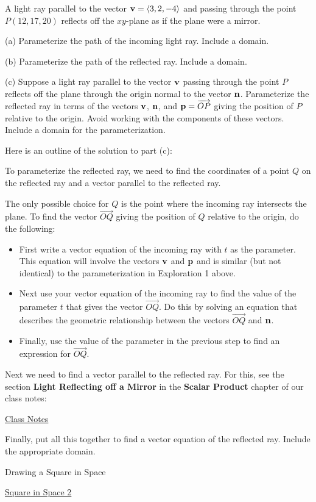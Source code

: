 \documentclass{ximera}
\begin{document}
\begin{question}  \label{Qdr5577:Lines}
A light ray parallel to the vector ${\bf v} = \langle 3,2,-4 \rangle$ and passing through the point $P(12, 17,20)$ reflects off the $xy$-plane as if the plane were a mirror.

(a) Parameterize the path of the incoming light ray. Include a domain.

(b) Parameterize the path of the reflected ray. Include a domain.

(c) Suppose a light ray parallel to the vector ${\bf v}$ passing through the point $P$ reflects off the plane through the origin normal to the vector ${\bf n}$. Parameterize the reflected ray in terms of the vectors ${\bf v}$, ${\bf n}$, and ${\bf p} = \overrightarrow{OP}$ giving the position of $P$ relative to the origin. Avoid working with the components of these vectors. Include a domain for the parameterization.

Here is an outline of the solution to part (c):

To parameterize the reflected ray, we need to find the coordinates of a point $Q$ on the reflected ray and a vector parallel to the reflected ray. 

The only possible choice for $Q$ is the point where the incoming ray intersects the plane. To find the vector $\overrightarrow{OQ}$ giving the position of $Q$ relative to the origin, do the following:

\begin{itemize}

\item{First write a vector equation of the incoming ray with $t$ as the parameter. This equation will involve the vectors ${\bf v}$ and ${\bf  p}$ and is similar (but not identical) to the parameterization in Exploration 1 above.} 

\item{Next use your vector equation of the incoming ray to find the value of the parameter $t$ that gives the vector $\overrightarrow{OQ}$. Do this by solving an equation that describes the geometric relationship between the vectors $\overrightarrow{OQ}$ and ${\bf n}$. }

\item{Finally, use the value of the parameter in the previous step to find an expression for $\overrightarrow{OQ}$.}

\end{itemize}

Next we need to find a vector parallel to the reflected ray. For this, see the section {\bf Light Reflecting off a Mirror} in the {\bf Scalar Product} chapter of our class notes:

\href{https://ximera.osu.edu/calc3/Calculus3/ScalarProduct/ScalarProduct}{Class Notes}

Finally, put all this together to find a vector equation of the reflected ray. Include the appropriate domain.

\end{question}



Drawing a Square in Space

\href{https://www.desmos.com/3d/3a19b63ef0}{Square in Space 2}
\end{document}
